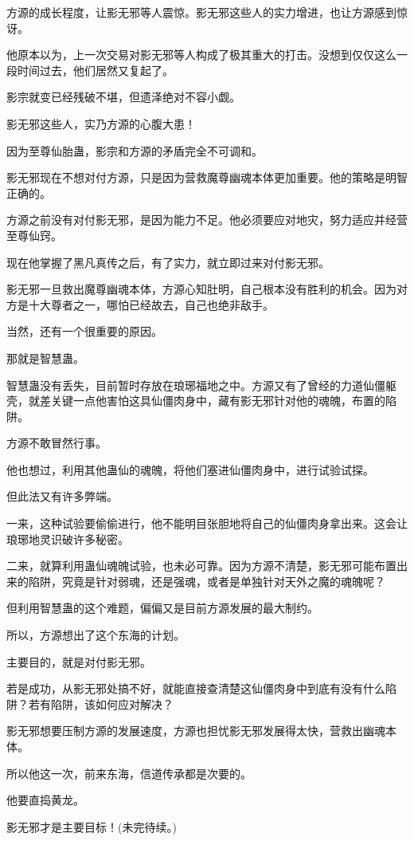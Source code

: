 \begin{this_body}
方源的成长程度，让影无邪等人震惊。影无邪这些人的实力增进，也让方源感到惊讶。

他原本以为，上一次交易对影无邪等人构成了极其重大的打击。没想到仅仅这么一段时间过去，他们居然又复起了。

影宗就变已经残破不堪，但遗泽绝对不容小觑。

影无邪这些人，实乃方源的心腹大患！

因为至尊仙胎蛊，影宗和方源的矛盾完全不可调和。

影无邪现在不想对付方源，只是因为营救魔尊幽魂本体更加重要。他的策略是明智正确的。

方源之前没有对付影无邪，是因为能力不足。他必须要应对地灾，努力适应并经营至尊仙窍。

现在他掌握了黑凡真传之后，有了实力，就立即过来对付影无邪。

影无邪一旦救出魔尊幽魂本体，方源心知肚明，自己根本没有胜利的机会。因为对方是十大尊者之一，哪怕已经故去，自己也绝非敌手。

当然，还有一个很重要的原因。

那就是智慧蛊。

智慧蛊没有丢失，目前暂时存放在琅琊福地之中。方源又有了曾经的力道仙僵躯壳，就差关键一点他害怕这具仙僵肉身中，藏有影无邪针对他的魂魄，布置的陷阱。

方源不敢冒然行事。

他也想过，利用其他蛊仙的魂魄，将他们塞进仙僵肉身中，进行试验试探。

但此法又有许多弊端。

一来，这种试验要偷偷进行，他不能明目张胆地将自己的仙僵肉身拿出来。这会让琅琊地灵识破许多秘密。

二来，就算利用蛊仙魂魄试验，也未必可靠。因为方源不清楚，影无邪可能布置出来的陷阱，究竟是针对弱魂，还是强魂，或者是单独针对天外之魔的魂魄呢？

但利用智慧蛊的这个难题，偏偏又是目前方源发展的最大制约。

所以，方源想出了这个东海的计划。

主要目的，就是对付影无邪。

若是成功，从影无邪处搞不好，就能直接查清楚这仙僵肉身中到底有没有什么陷阱？若有陷阱，该如何应对解决？

影无邪想要压制方源的发展速度，方源也担忧影无邪发展得太快，营救出幽魂本体。

所以他这一次，前来东海，信道传承都是次要的。

他要直捣黄龙。

影无邪才是主要目标！(未完待续。)

\end{this_body}

